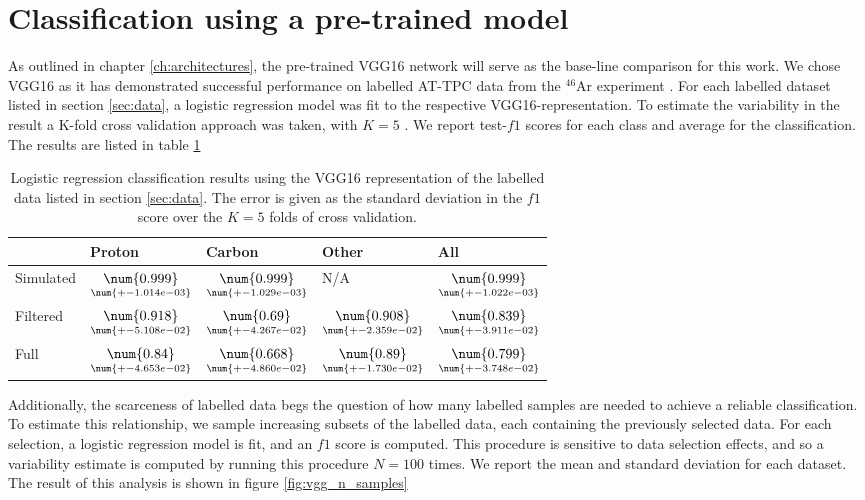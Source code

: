 \section{Classification using a pre-trained model}

As outlined in chapter \ref{ch:architectures}, the pre-trained VGG16 network will serve as the base-line comparison for this work. We chose VGG16 as it has demonstrated successful performance on labelled AT-TPC data from the ${}^{46}$Ar experiment \cite{Kuchera2019}. For each labelled dataset listed in section \ref{sec:data}, a logistic regression model was fit to the respective VGG16-representation. To estimate the variability in the result a K-fold cross validation approach was taken, with $K=5$ \cite{Stone1974}. We report test-$f1$ scores for each class and average for the classification. The results are listed in table \ref{tab:vgg_results}

\begin{table}
\centering
\caption[VGG classification results]{Logistic regression classification results using the VGG16 representation of the labelled data listed in section \ref{sec:data}. The error is given as the standard deviation in the $f1$ score over the $K=5$ folds of cross validation.}\label{tab:vgg_results}
\begin{tabular}{lllll}
\toprule
{} & Proton & Carbon & Other & All \\
\midrule
Simulated &  $\underset{\num{+- 1.014e-03 }  }{\num{ 0.999 } }$ &  $\underset{\num{+- 1.029e-03 }  }{\num{ 0.999 } }$ &  N/A &  $\underset{\num{+- 1.022e-03 }  }{\num{ 0.999 } }$ \\
Filtered  &  $\underset{\num{+- 5.108e-02 }  }{\num{ 0.918 } }$ &  $\underset{\num{+- 4.267e-02 }  }{\num{ 0.69 } }$ &  $\underset{\num{+- 2.359e-02 }  }{\num{ 0.908 } }$ &  $\underset{\num{+- 3.911e-02 }  }{\num{ 0.839 } }$ \\
Full      &  $\underset{\num{+- 4.653e-02 }  }{\num{ 0.84 } }$ &  $\underset{\num{+- 4.860e-02 }  }{\num{ 0.668 } }$ &  $\underset{\num{+- 1.730e-02 }  }{\num{ 0.89 } }$ &  $\underset{\num{+- 3.748e-02 }  }{\num{ 0.799 } }$ \\
\bottomrule
\end{tabular}
\end{table}

 Additionally, the scarceness of labelled data begs the question of how many labelled samples are needed to achieve a reliable classification. To estimate this relationship, we sample increasing subsets of the labelled data, each containing the previously selected data. For each selection, a logistic regression model is fit, and an $f1$ score is computed. This procedure is sensitive to data selection effects, and so a variability estimate is computed by running this procedure $N=100$ times. We report the mean and standard deviation for each dataset. The result of this analysis is shown in figure \ref{fig:vgg_n_samples}

